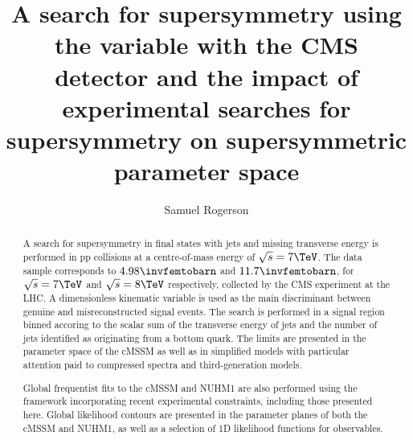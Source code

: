 \documentclass[]{mythesis}
\title{A search for supersymmetry using the \aT variable with the CMS detector
    and the impact of experimental searches for supersymmetry on supersymmetric
parameter space}
\author{Samuel Rogerson}
\begin{document}


\setcounter{page}{1}
  \maketitle
  \begin{abstract}

      A search for supersymmetry in final states with jets and missing
      transverse energy is performed in pp collisions at a centre-of-mass energy
      of $\sqrt{s}=7\TeV$. The data sample corresponds to $4.98\invfemtobarn$
      and $11.7\invfemtobarn$, for $\sqrt{s}=7\TeV$ and $\sqrt{s}=8\TeV$
      respectively, collected by the CMS experiment at the LHC.  A dimensionless
      kinematic variable is used as the main discriminant between genuine and
      misreconstructed signal events. The search is performed in a signal region
      binned accoring to the scalar sum of the transverse energy of jets and the
      number of jets identified as originating from a bottom quark.  The limits
      are presented in the parameter space of the \ac{cMSSM} as well as in
      simplified models with particular attention paid to compressed spectra and
      third-generation models.

      Global frequentist fits to the \ac{cMSSM} and NUHM1 are also performed using
      the \Mastercode framework incorporating recent experimental constraints,
      including those presented here.  Global likelihood contours are presented
      in the parameter planes of both the \ac{cMSSM} and NUHM1, as well as
      a selection of 1D likelihood functions for observables.
  
  \end{abstract}
  
  \tableofcontents \listoffigures

\newpage
{}
\setcounter{page}{1}
  
  
  
  
  
  
  

%
  
  
\end{document}
